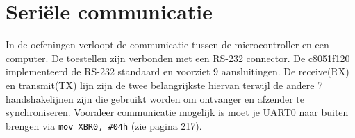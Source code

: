 \documentclass{report}
\begin{document}
\chapter{Seriële communicatie}
In de oefeningen verloopt de communicatie tussen de microcontroller en een computer. De toestellen zijn verbonden met een RS-232 connector. De c8051f120 implementeerd de RS-232 standaard en voorziet 9 aansluitingen. De receive(RX) en transmit(TX) lijn zijn de twee belangrijkste hiervan terwijl de andere 7 handshakelijnen zijn die gebruikt worden om ontvanger en afzender te synchroniseren. Vooraleer communicatie mogelijk is moet je UART0 naar buiten brengen via \texttt{mov XBR0, \#04h} (zie pagina 217).
\end{document}
